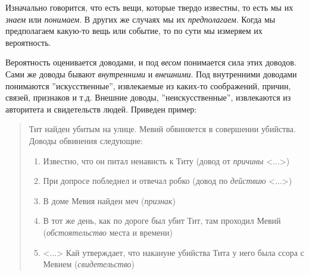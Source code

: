 \documentclass[12pt]{extarticle}
\begin{document}
Изначально говорится, что есть вещи, которые твердо известны, то есть мы их \textit{знаем} или \textit{понимаем}. 
В других же случаях мы их \textit{предполагаем}.
Когда мы предполагаем какую-то вещь или событие, то по сути мы измеряем их вероятность. 

Вероятность оценивается доводами, и под \textit{весом} понимается сила этих доводов.
Сами же доводы бывают \textit{внутренними} и \textit{внешними}.
Под внутренними доводами понимаются ''искусственные'', извлекаемые из каких-то соображений, причин, связей, признаков и т.д. 
Внешние доводы, ''неискусственные'', извлекаются из авторитета и свидетельств людей.
Приведен пример:
\begin{quote}
Тит найден убитым на улице.
Мевий обвиняется в совершении убийства.
Доводы обвинения следующие:
	\begin{enumerate}
	\item Известно, что он питал ненависть к Титу (довод от \textit{причины} <...>)
	\item При допросе побледнел и отвечал робко (довод по \textit{действию} <...>)
	\item В доме Мевия найден меч (\textit{признак})
	\item В тот же день, как по дороге был убит Тит, там проходил Мевий  (\textit{обстоятельство} места и времени)
	\item <...> Кай утверждает, что накануне убийства Тита у него была ссора с Мевием (\textit{свидетельство})
	\end{enumerate}
\end{quote}
\end{document}
